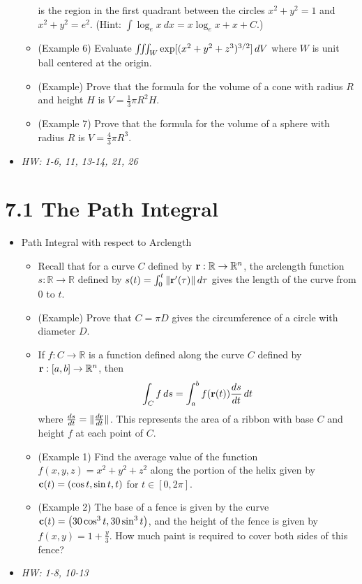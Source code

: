\documentclass[11pt]{article}
\begin{document}
\begin{itemize}
\begin{itemize}
            is the region in the first quadrant between the circles
            \(x^2+y^2=1\) and \(x^2+y^2=e^2\).
            (Hint: \(\int \log_e x ~dx = x\log_e x + x + C\).)
      \item (Example 6) Evaluate \(\iiint_W\exp[(x^2+y^2+z^3)^{3/2}]\,d V\)
            where \(W\) is unit ball centered at the origin.
      \item (Example) Prove that the formula for the volume of a cone with
            radius \(R\) and height \(H\) is \(V=\frac{1}{3}\pi R^2H\).
      \item (Example 7) Prove that the formula for the volume of a sphere with
            radius \(R\) is \(V=\frac{4}{3}\pi R^3\).
    \end{itemize}
  \item\textit{
    HW: 1-6, 11, 13-14, 21, 26
  }
\end{itemize}



\section*{7.1 The Path Integral}

\begin{itemize}
  \item Path Integral with respect to Arclength
    \begin{itemize}
      \item Recall that for a curve \(C\) defined by
            \(\mathbf{r}:\mathbb R\to\mathbb R^n\), the arclength function
            \(s:\mathbb R\to\mathbb R\) defined by
            \(s(t)=\int_0^t\|\mathbf{r}'(\tau)\|\,d\tau\) gives the length
            of the curve from \(0\) to \(t\).
      \item (Example) Prove that \(C=\pi D\) gives the circumference of
            a circle with diameter \(D\).
      \item If \(f:C\to\mathbb R\) is a function defined
            along the curve \(C\) defined by \(\mathbf{r}:[a,b]\to\mathbb R^n\),
            then
            \[
              \int_C f\,d s
                =
              \int_a^b f(\mathbf{r}(t))\frac{ds}{dt}\,d t
            \]
            where \(\frac{ds}{dt}=\|\frac{d\mathbf{r}}{dt}\|\).
            This represents the area of a ribbon with base \(C\) and
            height \(f\) at each point of \(C\).
      \item (Example 1) Find the average value of the function
            \(f(x,y,z)=x^2+y^2+z^2\) along the portion of the helix given by
            \(\mathbf{c}(t)=\left(\cos t,\sin t,t\right)\) for \(t\in[0,2\pi]\).
      \item (Example 2) The base of a fence is given by the curve
            \(\mathbf{c}(t)=\left(30\cos^3t,30\sin^3t\right)\), and the height of the
            fence is given by \(f(x,y)=1+\frac{y}{3}\). How much paint is
            required to cover both sides of this fence?
    \end{itemize}
  \item\textit{
    HW: 1-8, 10-13
  }
\end{itemize}
\end{document}
